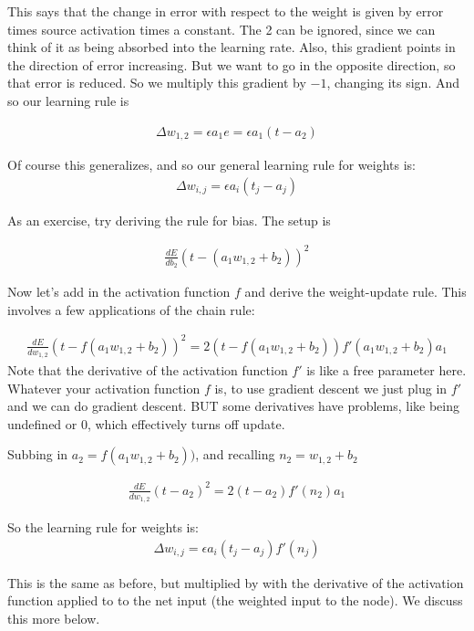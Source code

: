 This says that the change in error with respect to the weight is given by error times source activation times a constant. The 2 can be ignored, since we can think of it as being absorbed into the learning rate. Also, this gradient points in the direction of error increasing. But we want to go in the opposite direction, so that error is reduced. So we multiply this gradient by $-1$, changing its sign. And so our learning rule is 

\begin{eqnarray*}
\Delta w_{1,2}  =  \epsilon a_1 e  = \epsilon a_1 (t - a_2)
\end{eqnarray*} 

Of course this generalizes, and so our general learning rule for weights is:
\begin{eqnarray*}
\Delta w_{i,j}  =  \epsilon a_i (t_j - a_j)
\end{eqnarray*} 

As an exercise, try deriving the rule for bias. The setup is

\begin{eqnarray*}
\frac{dE}{db_{2}} (t - ( a_1 w_{1,2} + b_2))^2 
\end{eqnarray*}

Now let's add in the activation function $f$ and derive the weight-update rule.  This involves a few applications of the chain rule:

\begin{eqnarray*}
\frac{dE}{dw_{1,2}} (t - f(a_1w_{1,2} + b_2))^2   = 2 (t - f(a_1w_{1,2} + b_2)) f'(a_1w_{1,2} + b_2) a_1 
\end{eqnarray*}
Note that the derivative of the activation function $f'$ is like a free parameter here. Whatever your activation function $f$ is, to use gradient descent we just plug in $f'$ and we can do gradient descent. BUT some derivatives have problems, like being undefined or 0, which effectively turns off update.

Subbing in $a_2 = f(a_1w_{1,2} + b_2))$, and recalling $n_2 = w_{1,2} + b_2$ 

\begin{eqnarray*}
\frac{dE}{dw_{1,2}} (t - a_2)^2   = 2 (t - a_2) f'(n_2) a_1 
\end{eqnarray*}

So the learning rule for weights is:
\begin{eqnarray*}
\Delta w_{i,j}  =  \epsilon a_i (t_j - a_j) f'(n_j)
\end{eqnarray*} 

This is the same as before, but multiplied by with the derivative of the activation function applied to to the net input (the weighted input to the node). We discuss this more below.

